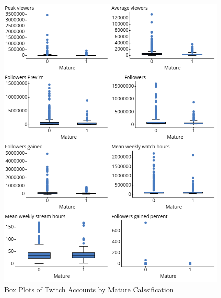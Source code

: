 \documentclass[12pt]{article}
\begin{document}
\begin{figure}[H]
  \centering %
  \includegraphics[width=0.8\linewidth]{../StatCrunch_Results/mature/box_plots}
  \captionsetup{justification=centering, singlelinecheck=false, margin=2cm}
  \caption[Box Plots of Twitch Accounts by Mature Calssification]{Box Plots of Twitch Accounts by Mature Calssification}
  \label{fig:box_plots_mature}
\end{figure}
\end{document}
